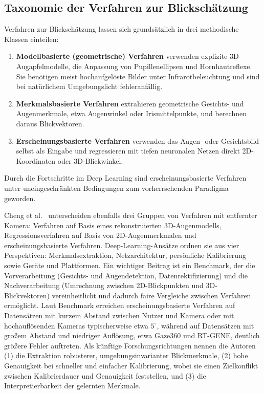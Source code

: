 \documentclass[
  11pt,
  a4paper,
  oneside,
  DIV=12,                 %
  BCOR=8mm,               %
  parskip=half,           %
  headings=normal,
  bibliography=totoc,     %
  listof=totoc            %
]{scrreprt}
\begin{document}
\subsection{Taxonomie der Verfahren zur Blickschätzung}
\label{subsec:taxonomie}
Verfahren zur Blickschätzung lassen sich grundsätzlich in drei methodische Klassen einteilen:
\begin{enumerate}
  \item \textbf{Modellbasierte (geometrische) Verfahren} verwenden explizite 3D-Augapfelmodelle, die Anpassung von Pupillenellipsen und Hornhautreflexe. Sie benötigen meist hochaufgelöste Bilder unter Infrarotbeleuchtung und sind bei natürlichem Umgebungslicht fehleranfällig.
  \item \textbf{Merkmalsbasierte Verfahren} extrahieren geometrische Gesichts- und Augenmerkmale, etwa Augenwinkel oder Irismittelpunkte, und berechnen daraus Blickvektoren.
  \item \textbf{Erscheinungsbasierte Verfahren} verwenden das Augen- oder Gesichtsbild selbst als Eingabe und regressieren mit tiefen neuronalen Netzen direkt 2D-Koordinaten oder 3D-Blickwinkel.
\end{enumerate}
Durch die Fortschritte im Deep Learning sind erscheinungsbasierte Verfahren unter uneingeschränkten Bedingungen zum vorherrschenden Paradigma geworden.

Cheng et al.~\cite{cheng2024review} unterscheiden ebenfalls drei Gruppen von Verfahren mit entfernter Kamera: Verfahren auf Basis eines rekonstruierten 3D-Augenmodells, Regressionsverfahren auf Basis von 2D-Augenmerkmalen und erscheinungsbasierte Verfahren. Deep-Learning-Ansätze ordnen sie aus vier Perspektiven: Merkmalsextraktion, Netzarchitektur, persönliche Kalibrierung sowie Geräte und Plattformen. Ein wichtiger Beitrag ist ein Benchmark, der die Vorverarbeitung (Gesichts- und Augendetektion, Datenrektifizierung) und die Nachverarbeitung (Umrechnung zwischen 2D-Blickpunkten und 3D-Blickvektoren) vereinheitlicht und dadurch faire Vergleiche zwischen Verfahren ermöglicht. Laut Benchmark erreichen erscheinungsbasierte Verfahren auf Datensätzen mit kurzem Abstand zwischen Nutzer und Kamera oder mit hochauflösenden Kameras typischerweise etwa $5^\circ$, während auf Datensätzen mit großem Abstand und niedriger Auflösung, etwa Gaze360 und RT-GENE, deutlich größere Fehler auftreten. Als künftige Forschungsrichtungen nennen die Autoren (1) die Extraktion robusterer, umgebungsinvarianter Blickmerkmale, (2) hohe Genauigkeit bei schneller und einfacher Kalibrierung, wobei sie einen Zielkonflikt zwischen Kalibrierdauer und Genauigkeit feststellen, und (3) die Interpretierbarkeit der gelernten Merkmale.
\end{document}
